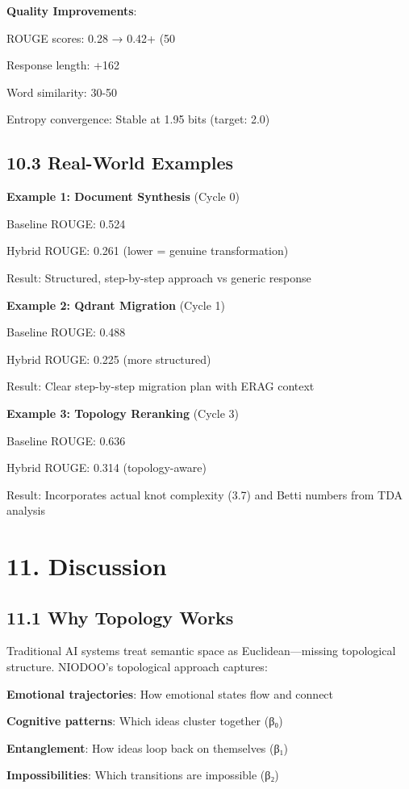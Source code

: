 \documentclass[11pt,a4paper]{article}
\begin{document}
\textbf{Quality Improvements}:
\item ROUGE scores: 0.28 → 0.42+ (50%
\item Response length: +162%
\item Word similarity: 30-50%
\item Entropy convergence: Stable at 1.95 bits (target: 2.0)

\subsection{10.3 Real-World Examples}

\textbf{Example 1: Document Synthesis} (Cycle 0)
\item Baseline ROUGE: 0.524
\item Hybrid ROUGE: 0.261 (lower = genuine transformation)
\item Result: Structured, step-by-step approach vs generic response

\textbf{Example 2: Qdrant Migration} (Cycle 1)
\item Baseline ROUGE: 0.488
\item Hybrid ROUGE: 0.225 (more structured)
\item Result: Clear step-by-step migration plan with ERAG context

\textbf{Example 3: Topology Reranking} (Cycle 3)
\item Baseline ROUGE: 0.636
\item Hybrid ROUGE: 0.314 (topology-aware)
\item Result: Incorporates actual knot complexity (3.7) and Betti numbers from TDA analysis

\section{11. Discussion}

\subsection{11.1 Why Topology Works}

Traditional AI systems treat semantic space as Euclidean—missing topological structure. NIODOO's topological approach captures:
\item \textbf{Emotional trajectories}: How emotional states flow and connect
\item \textbf{Cognitive patterns}: Which ideas cluster together (β₀)
\item \textbf{Entanglement}: How ideas loop back on themselves (β₁)
\item \textbf{Impossibilities}: Which transitions are impossible (β₂)
\end{document}
